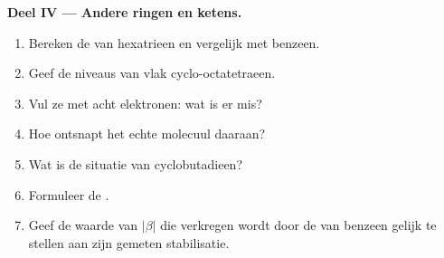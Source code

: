 \begin{problem}
\medskip
\noindent\textbf{Deel IV --- Andere ringen en ketens.}
\begin{enumerate}[resume]
  \item Bereken de  van hexatrieen en vergelijk met benzeen.
  \item Geef de niveaus van vlak cyclo-octatetraeen.
  \item Vul ze met acht elektronen: wat is er mis?
  \item Hoe ontsnapt het echte molecuul daaraan?
  \item Wat is de situatie van cyclobutadieen?
  \item Formuleer de .
  \item Geef de waarde van $|\beta|$ die verkregen wordt door de  van benzeen
        gelijk te stellen aan zijn gemeten stabilisatie.
\end{enumerate}
\end{problem}
